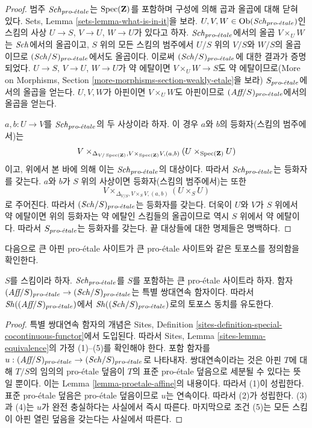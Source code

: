\begin{proof}
범주 $\mathit{Sch}_{pro\text{-}\acute{e}tale}$는 $\mathop{\mathrm{Spec}}(\mathbf{Z})$를 포함하며 구성에 의해 곱과
올곱에 대해 닫혀 있다. Sets, Lemma \ref{sets-lemma-what-is-in-it}을 보라.
$U, V, W \in \mathop{\mathrm{Ob}}\nolimits(\mathit{Sch}_{pro\text{-}\acute{e}tale})$인 스킴의 사상
$U \to S$, $V \to U$, $W \to U$가 있다고 하자.
$\mathit{Sch}_{pro\text{-}\acute{e}tale}$에서의 올곱 $V \times_U W$는 $\mathit{Sch}$에서의 올곱이고,
$S$ 위의 모든 스킴의 범주에서 $U/S$ 위의 $V/S$와 $W/S$의 올곱이므로
$(\mathit{Sch}/S)_{pro\text{-}\acute{e}tale}$에서도 올곱이다. 이로써 $(\mathit{Sch}/S)_{pro\text{-}\acute{e}tale}$에 대한
결과가 증명되었다. $U \to S$, $V \to U$, $W \to U$가 약 에탈이면
$V \times_U W \to S$도 약 에탈이므로(More on Morphisms, Section
\ref{more-morphisms-section-weakly-etale}을 보라) $S_{pro\text{-}\acute{e}tale}$에서의
올곱을 얻는다. $U, V, W$가 아핀이면 $V \times_U W$도 아핀이므로
$(\textit{Aff}/S)_{pro\text{-}\acute{e}tale}$에서의 올곱을 얻는다.

\medskip\noindent
$a, b : U \to V$를 $\mathit{Sch}_{pro\text{-}\acute{e}tale}$의 두 사상이라 하자.
이 경우 $a$와 $b$의 등화자(스킴의 범주에서)는
$$
V
\times_{\Delta_{V/\mathop{\mathrm{Spec}}(\mathbf{Z})}, V \times_{\mathop{\mathrm{Spec}}(\mathbf{Z})} V, (a, b)}
(U \times_{\mathop{\mathrm{Spec}}(\mathbf{Z})} U)
$$
이고, 위에서 본 바에 의해 이는 $\mathit{Sch}_{pro\text{-}\acute{e}tale}$의 대상이다.
따라서 $\mathit{Sch}_{pro\text{-}\acute{e}tale}$는 등화자를 갖는다. $a$와 $b$가 $S$ 위의
사상이면 등화자(스킴의 범주에서)는 또한
$$
V \times_{\Delta_{V/S}, V \times_S V, (a, b)} (U \times_S U)
$$
로 주어진다. 따라서 $(\mathit{Sch}/S)_{pro\text{-}\acute{e}tale}$는 등화자를 갖는다.
더욱이 $U$와 $V$가 $S$ 위에서 약 에탈이면 위의 등화자는
약 에탈인 스킴들의 올곱이므로 역시 $S$ 위에서 약 에탈이다.
따라서 $S_{pro\text{-}\acute{e}tale}$는 등화자를 갖는다. 끝 대상들에 대한 명제들은 명백하다.
\end{proof}

\noindent
다음으로 큰 아핀 pro-\'etale 사이트가 큰 pro-\'etale 사이트와 같은
토포스를 정의함을 확인한다.

\begin{lemma}
\label{lemma-affine-big-site-proetale}
$S$를 스킴이라 하자. $\mathit{Sch}_{pro\text{-}\acute{e}tale}$를 $S$를 포함하는 큰
pro-\'etale 사이트라 하자. 함자
$(\textit{Aff}/S)_{pro\text{-}\acute{e}tale} \to (\mathit{Sch}/S)_{pro\text{-}\acute{e}tale}$는 특별 쌍대연속
함자이다. 따라서 $\mathop{\mathit{Sh}}\nolimits((\textit{Aff}/S)_{pro\text{-}\acute{e}tale})$에서
$\mathop{\mathit{Sh}}\nolimits((\mathit{Sch}/S)_{pro\text{-}\acute{e}tale})$로의 토포스 동치를 유도한다.
\end{lemma}

\begin{proof}
특별 쌍대연속 함자의 개념은 Sites, Definition
\ref{sites-definition-special-cocontinuous-functor}에서 도입된다.
따라서 Sites, Lemma \ref{sites-lemma-equivalence}의 가정 (1)--(5)를
확인해야 한다. 포함 함자를
$u : (\textit{Aff}/S)_{pro\text{-}\acute{e}tale} \to (\mathit{Sch}/S)_{pro\text{-}\acute{e}tale}$로 나타내자.
쌍대연속이라는 것은 아핀 $T$에 대해 $T/S$의 임의의 pro-\'etale 덮음이
$T$의 표준 pro-\'etale 덮음으로 세분될 수 있다는 뜻일 뿐이다.
이는 Lemma \ref{lemma-proetale-affine}의 내용이다. 따라서 (1)이 성립한다.
표준 pro-\'etale 덮음은 pro-\'etale 덮음이므로 $u$는 연속이다.
따라서 (2)가 성립한다. (3)과 (4)는 $u$가 완전 충실하다는 사실에서
즉시 따른다. 마지막으로 조건 (5)는 모든 스킴이 아핀 열린 덮음을
갖는다는 사실에서 따른다.
\end{proof}

